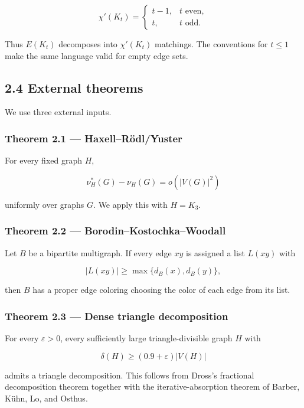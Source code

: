 \documentclass[11pt,a4paper]{article}
\begin{document}
\[
\chi'(K_t)
=
\begin{cases}
t-1,&t\text{ even},\\
t,&t\text{ odd}.
\end{cases}
\tag{2.2}
\]

Thus \(E(K_t)\) decomposes into \(\chi'(K_t)\) matchings. The conventions for \(t\le1\) make the same language valid for empty edge sets.

\subsection{2.4 External theorems}\label{external-theorems}

We use three external inputs.

\subsubsection{Theorem 2.1 --- Haxell--Rödl/Yuster}\label{theorem-2.1-haxellruxf6dlyuster}

For every fixed graph \(H\),

\[
\nu_H^*(G)-\nu_H(G)=o(|V(G)|^2)
\]

uniformly over graphs \(G\). We apply this with \(H=K_3\).

\subsubsection{Theorem 2.2 --- Borodin--Kostochka--Woodall}\label{theorem-2.2-borodinkostochkawoodall}

Let \(B\) be a bipartite multigraph. If every edge \(xy\) is assigned a list \(L(xy)\) with

\[
|L(xy)|\ge\max\{d_B(x),d_B(y)\},
\]

then \(B\) has a proper edge coloring choosing the color of each edge from its list.

\subsubsection{Theorem 2.3 --- Dense triangle decomposition}\label{theorem-2.3-dense-triangle-decomposition}

For every \(\varepsilon>0\), every sufficiently large triangle-divisible graph \(H\) with

\[
\delta(H)\ge(0.9+\varepsilon)|V(H)|
\]

admits a triangle decomposition. This follows from Dross's fractional decomposition theorem together with the iterative-absorption theorem of Barber, Kühn, Lo, and Osthus.
\end{document}
